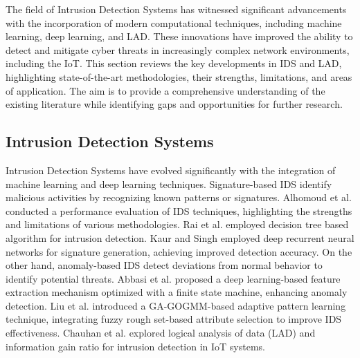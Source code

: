 \documentclass[pdflatex,sn-mathphys-num]{sn-jnl}%
\theoremstyle{thmstyleone}%
\theoremstyle{thmstyletwo}%
\theoremstyle{thmstylethree}%
\begin{document}
The field of Intrusion Detection Systems has witnessed significant advancements with the incorporation of modern computational techniques, including machine learning, deep learning, and LAD. These innovations have improved the ability to detect and mitigate cyber threats in increasingly complex network environments, including the IoT. This section reviews the key developments in IDS and LAD, highlighting state-of-the-art methodologies, their strengths, limitations, and areas of application. The aim is to provide a comprehensive understanding of the existing literature while identifying gaps and opportunities for further research.

\subsection{Intrusion Detection Systems}
Intrusion Detection Systems have evolved significantly with the integration of machine learning and deep learning techniques. Signature-based IDS identify malicious activities by recognizing known patterns or signatures. Alhomoud et al. \cite{IDS4} conducted a performance evaluation of IDS techniques, highlighting the strengths and limitations of various methodologies. Rai et al. \cite{IDS12} employed decision tree based algorithm for intrusion detection. Kaur and Singh \cite{IDS14} employed deep recurrent neural networks for signature generation, achieving improved detection accuracy. On the other hand, anomaly-based IDS detect deviations from normal behavior to identify potential threats. Abbasi et al. \cite{IDS1} proposed a deep learning-based feature extraction mechanism optimized with a finite state machine, enhancing anomaly detection. Liu et al. \cite{IDS3} introduced a GA-GOGMM-based adaptive pattern learning technique, integrating fuzzy rough set-based attribute selection to improve IDS effectiveness. Chauhan et al. \cite{IDS15} explored logical analysis of data (LAD) and information gain ratio for intrusion detection in IoT systems.
\end{document}
